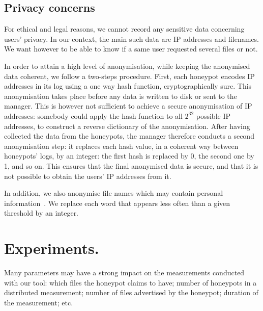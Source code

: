\documentclass[final,
notitlepage,
narroweqnarray,
	inline,
	twoside,
]{ieee}
\begin{document}
\subsection{Privacy concerns }
For ethical and legal reasons, we cannot record any 
sensitive data concerning users' privacy.
In our context, the main such data are IP addresses and filenames.
We want however to be able to know if a same user requested several
files or not.

In order to attain a high level of anonymisation, while keeping the anonymised
data coherent, we follow a two-steps procedure.
First, each
honeypot encodes IP addresses in its log using a one way hash function,
cryptographically sure. This anonymisation takes place before any data is written
to disk or sent to the manager.
This is however not sufficient to achieve a secure anonymisation of IP addresses:
somebody could apply the hash function to all $2^{32}$ possible IP addresses,
to construct a reverse dictionary of the anonymisation.
After having collected the data from the honeypots,
the manager therefore conducts a second anonymisation step:
it replaces each hash value, in a
coherent way between honeypots' logs,
by an integer: the first hash is replaced by 0, the second one by 1, and so on.
This ensures that the final anonymised data is secure,
and that it is not possible to obtain the users' IP addresses from it.

In addition, we also anonymise file names which may contain personal 
information~\cite{file-inf,Adar2007}. 
We replace each word that appears less often than a given threshold by an integer.


\section{Experiments.}
\label{sec-measurements}

Many parameters may have a strong impact on the measurements conducted with our tool: which files the honeypot claims to have; number of honeypots in a distributed measurement; number of files advertised by the honeypot; duration of the measurement; etc.
\end{document}
